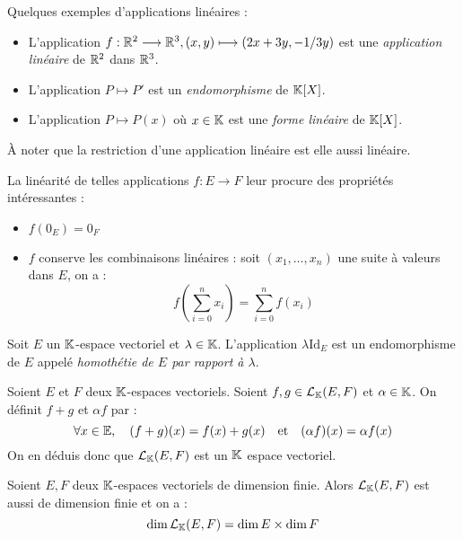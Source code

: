 \begin{example}
    Quelques exemples d'applications linéaires :
    \begin{itemize}
        \item L'application $f : \mathbb{R}^2 \longrightarrow \mathbb{R}^3, (x,y) \longmapsto (2x + 3y, -1/3y)$ est une \emph{application 
        linéaire} de $\mathbb{R}^2$ dans $\mathbb{R}^3$. 
        \item L'application $P \longmapsto P'$ est un \emph{endomorphisme} de $\mathbb{K}[X]$. 
        \item L'application $P \longmapsto P(x)$ où $x \in \mathbb{K}$ est une \emph{forme linéaire} de $\mathbb{K}[X]$. 
    \end{itemize}
\end{example}

\begin{remark}
    À noter que la restriction d'une application linéaire est elle aussi linéaire. 
\end{remark}

\begin{prop}
    La linéarité de telles applications $f : E \longrightarrow F$ leur procure des propriétés intéressantes : 
    \begin{itemize}
        \item $ f(0_E) = 0_F $ 
        \item $f$ conserve les combinaisons linéaires : soit $(x_1, \dots, x_n)$ une suite à valeurs dans $E$, on a :
            \[ f \left( \sum_{i=0}^{n} x_i \right) = \sum_{i=0}^{n} f(x_i) \] 
    \end{itemize}
\end{prop}

\begin{definition}[Homothétie]
    Soit $E$ un $\mathbb{K}$-espace vectoriel et $\lambda \in \mathbb{K}$. 
    L'application $ \lambda \text{Id}_E$ est un endomorphisme de $E$ appelé \emph{homothétie de $E$ par rapport à $\lambda$}. 
\end{definition}

\begin{proposition}
    Soient $E$ et $F$ deux $\mathbb{K}$-espaces vectoriels. Soient $f,g \in \mathcal{L}_{\mathbb{K}}(E,F)$ et $\alpha \in \mathbb{K}$. 
    On définit $f + g$ et $ \alpha f$ par :
        \[ \forall x \in \mathbb{E}, \quad (f+g)(x) = f(x) + g(x) \quad \text{et} \quad (\alpha f)(x) = \alpha f(x) \] 
    On en déduis donc que $ \mathcal{L}_{\mathbb{K}}(E,F)$ est un $\mathbb{K}$ espace vectoriel. 
\end{proposition}

\begin{theorem}
    Soient $E,F$ deux $\mathbb{K}$-espaces vectoriels de dimension finie. Alors 
    $ \mathcal{L}_{\mathbb{K}}(E,F)$ est aussi de dimension finie et on a :
        \[ \dim \mathcal{L}_{\mathbb{K}}(E,F) = \dim E \times \dim F \] 
\end{theorem}

